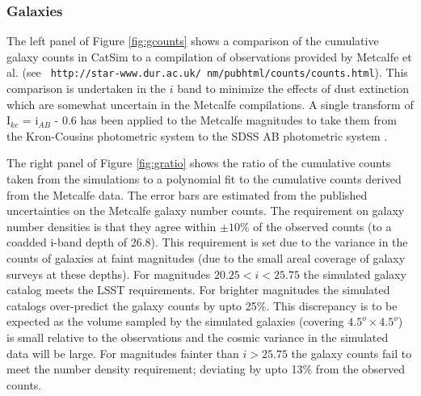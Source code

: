\documentclass[11pt]{article}
\begin{document}
\subsubsection{Galaxies \label{sec:galaxycounts}}

The left panel of Figure \ref{fig:gcounts} shows a comparison of the
cumulative galaxy counts in CatSim to a compilation of observations
provided by Metcalfe et al. (see {\tt
  http://star-www.dur.ac.uk/~nm/pubhtml/counts/counts.html}).  This
comparison is undertaken in the $i$ band to minimize the effects of
dust extinction which are somewhat uncertain in the Metcalfe
compilations.  A single transform of I$_{kc}$ = i$_{AB}$ - 0.6 has
been applied to the Metcalfe magnitudes to take them from the
Kron-Cousins photometric system to the SDSS AB photometric system \citep{ellis07}.

The right panel of Figure \ref{fig:gratio} shows the ratio of the
cumulative counts taken from the simulations to a polynomial fit to
the cumulative counts derived from the Metcalfe data.  The error bars
are estimated from the published uncertainties on the Metcalfe galaxy
number counts. The requirement on galaxy number densities is that they
agree within $\pm10\%$ of the observed counts (to a coadded i-band
depth of 26.8). This requirement is set due to the variance in the
counts of galaxies at faint magnitudes (due to the small areal
coverage of galaxy surveys at these depths).  For magnitudes
$20.25<i<25.75$ the simulated galaxy catalog meets the LSST
requirements.  For brighter magnitudes the simulated catalogs
over-predict the galaxy counts by upto 25\%. This discrepancy is to be
expected as the volume sampled by the simulated galaxies (covering
$4.5^o \times 4.5^o$) is small relative to the observations and the
cosmic variance in the simulated data will be large. For magnitudes
fainter than $i>25.75$ the galaxy counts fail to meet the number
density requirement; deviating by upto 13\% from the observed counts.

\end{document}
